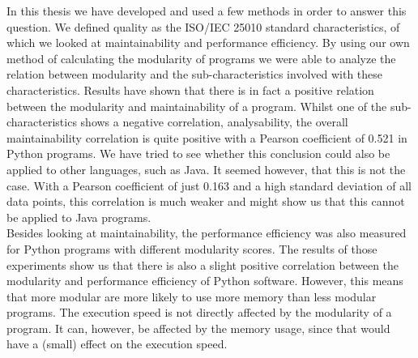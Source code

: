 \documentclass[twoside]{uva-inf-bachelor-thesis}
\begin{document}
In this thesis we have developed and used a few methods in order to answer this question. We defined quality as the ISO/IEC 25010 standard characteristics\cite{ISO25010}, of which we looked at maintainability and performance efficiency. By using our own method of calculating the modularity of programs we were able to analyze the relation between modularity and the sub-characteristics involved with these characteristics. Results have shown that there is in fact a positive relation between the modularity and maintainability of a program. Whilst one of the sub-characteristics shows a negative correlation, analysability, the overall maintainability correlation is quite positive with a Pearson coefficient of 0.521 in Python programs. We have tried to see whether this conclusion could also be applied to other languages, such as Java. It seemed however, that this is not the case. With a Pearson coefficient of just 0.163 and a high standard deviation of all data points, this correlation is much weaker and might show us that this cannot be applied to Java programs.\\

Besides looking at maintainability, the performance efficiency was also measured for Python programs with different modularity scores. The results of those experiments show us that there is also a slight positive correlation between the modularity and performance efficiency of Python software. However, this means that more modular are more likely to use more memory than less modular programs. The execution speed is not directly affected by the modularity of a program. It can, however, be affected by the memory usage, since that would have a (small) effect on the execution speed.



\end{document}
